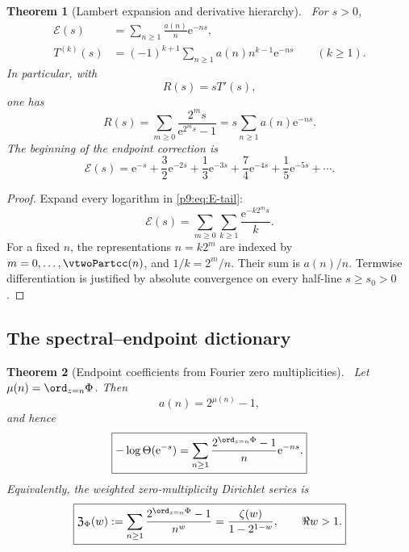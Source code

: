\documentclass[11pt]{article}
\numberwithin{equation}{section}
\newtheorem{theorem}{Theorem}[section]
\theoremstyle{definition}
\theoremstyle{remark}
\newcommand{\e}{\mathrm e}
\begin{document}
\begin{theorem}[Lambert expansion and derivative hierarchy]\label{p9:thm:Lambert-tail}
\statusN\ For $s>0$,
\begin{align}
 \mathcal E(s)&=\sum_{n\ge1}\frac{a(n)}n\e^{-ns},         \label{p9:eq:E-Lambert}\\
 T^{(k)}(s)&=(-1)^{k+1}\sum_{n\ge1}a(n)n^{k-1}\e^{-ns}
 \qquad(k\ge1).                                           \label{p9:eq:T-derivatives}
\end{align}
In particular, with
\begin{equation}
 R(s)=sT'(s),                                               \label{p9:eq:R-def}
\end{equation}
one has
\begin{equation}
 \boxed{
 R(s)=\sum_{m\ge0}\frac{2^ms}{\e^{2^ms}-1}
 =s\sum_{n\ge1}a(n)\e^{-ns}.}                             \label{p9:eq:R-Lambert}
\end{equation}
The beginning of the endpoint correction is
\begin{equation}
 \mathcal E(s)=\e^{-s}+\frac32\e^{-2s}+\frac13\e^{-3s}
 +\frac74\e^{-4s}+\frac15\e^{-5s}+\cdots.               \label{p9:eq:E-first}
\end{equation}
\end{theorem}

\begin{proof}
Expand every logarithm in \eqref{p9:eq:E-tail}:
\[
 \mathcal E(s)=\sum_{m\ge0}\sum_{k\ge1}\frac{\e^{-k2^ms}}k.
\]
For a fixed $n$, the representations $n=k2^m$ are indexed by
$m=0,\ldots,\vtwoPartcc(n)$, and $1/k=2^m/n$.  Their sum is $a(n)/n$.
Termwise differentiation is justified by absolute convergence on every half-line
$s\ge s_0>0$.
\end{proof}

\subsection{The spectral--endpoint dictionary}

\begin{theorem}[Endpoint coefficients from Fourier zero multiplicities]
\label{p9:thm:spectral-endpoint}
\statusN\ Let $\mu(n)=\ord_{z=n}\Phi$.  Then
\begin{equation}
 a(n)=2^{\mu(n)}-1,                                        \label{p9:eq:a-mu}
\end{equation}
and hence
\begin{equation}
 \boxed{
 -\log\Theta(\e^{-s})
 =\sum_{n\ge1}\frac{2^{\ord_{z=n}\Phi}-1}{n}\e^{-ns}.}   \label{p9:eq:spectral-endpoint}
\end{equation}
Equivalently, the weighted zero-multiplicity Dirichlet series is
\begin{equation}
 \boxed{
 \mathfrak Z_\Phi(w):=
 \sum_{n\ge1}\frac{2^{\ord_{z=n}\Phi}-1}{n^w}
 =\frac{\zeta(w)}{1-2^{1-w}},\qquad \Re w>1.}             \label{p9:eq:weighted-zero-zeta}
\end{equation}
\end{theorem}
\end{document}
